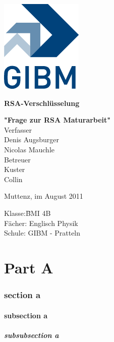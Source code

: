 \documentclass[12pt,a4paper,german]{article}
\begin{document}
\begin{titlepage}
\sffamily
\centering
\includegraphics{images/gibm_logo.png}

\vfill
{\bfseries\Huge RSA-Verschlüsselung}\\
\vfill

{\bfseries\Large "Frage zur RSA Maturarbeit"}\\
\vfill
Verfasser\\[1ex]
Denis Augsburger\\
Nicolas Mauchle\\
\vfill
Betreuer\\[1ex]
{\large Kuster}\\
{\large Collin}\\
\vfill

\raggedright
\small
Muttenz, im August 2011\\[2cm]
\begin{tabbing}
Klasse:\quad\quad\quad \=BMI 4B\\
Fächer: \> Englisch Physik \\
Schule: \> GIBM - Pratteln
\end{tabbing}
\end{titlepage}


\tableofcontents
\part{Part A}
\section{section a}
\subsection{subsection a }
\subsubsection{subsubsection a}
\end{document}
